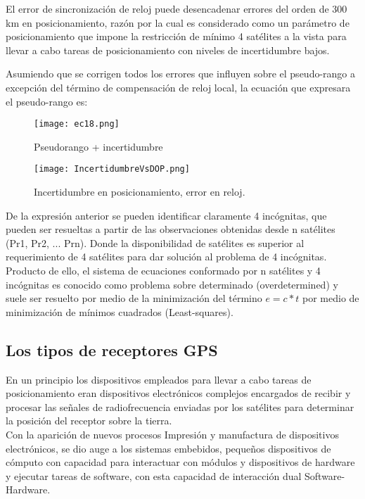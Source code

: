 El error de sincronización de reloj puede desencadenar errores del orden de 300 km en posicionamiento, razón por la cual es considerado como un parámetro de posicionamiento que impone la restricción de mínimo 4 satélites a la vista para llevar a cabo tareas de posicionamiento con niveles de incertidumbre bajos.

Asumiendo que se corrigen todos los errores que influyen sobre el pseudo-rango a excepción del término de compensación de reloj local, la ecuación que expresara el pseudo-rango es:

	\begin{figure}[ht]
		    \centering
		    \texttt{[image: ec18.png]}
		    \caption{Pseudorango + incertidumbre}
		    \label{fig:EcPseudoIncert}
	\end{figure}

	\begin{figure}[ht]
		    \centering
		    \normalcolor
		    \texttt{[image: IncertidumbreVsDOP.png]}
		    \caption{Incertidumbre en posicionamiento, error en reloj.}
		    \label{fig:IncertidumbrePosicionGPS}
	\end{figure}
	
De la expresión anterior se pueden identificar claramente 4 incógnitas, que pueden ser resueltas a partir de las observaciones obtenidas desde n satélites (Pr1, Pr2, ... Prn). Donde la disponibilidad de satélites es superior al requerimiento de 4 satélites para dar solución al problema de 4 incógnitas. Producto de ello, el sistema de ecuaciones conformado por n satélites y 4 incógnitas es conocido como problema sobre determinado (overdetermined) y suele ser resuelto por medio de la minimización del término \textit{$e = c*t$} por medio de minimización de mínimos cuadrados (Least-squares).


\subsection{Los tipos de receptores GPS}

En un principio  los dispositivos empleados para llevar a cabo tareas de posicionamiento eran dispositivos electrónicos complejos encargados de recibir y procesar las señales de radiofrecuencia enviadas por los satélites para determinar la posición del receptor sobre la tierra.\\

Con la aparición de nuevos procesos Impresión y manufactura de dispositivos electrónicos, se dio auge a los sistemas embebidos, pequeños dispositivos de cómputo  con capacidad para interactuar con módulos y dispositivos de hardware y ejecutar tareas de software, con esta capacidad de interacción dual Software-Hardware.\\

